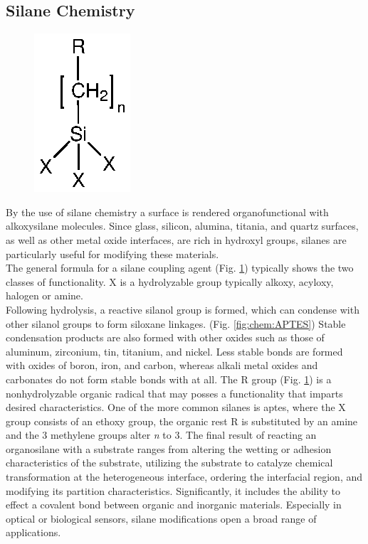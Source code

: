 \subsection{Silane Chemistry}
\begin{figure}
	\centering
	\includegraphics{Ressources/Chemistry/Trialkoxysilan}
	\label{fig:chem:trialkoxysilane}
\end{figure} 
By the use of silane chemistry a surface is rendered organofunctional with alkoxysilane molecules. Since glass, silicon, alumina, titania, and quartz surfaces, as well as other metal oxide interfaces, are rich in hydroxyl groups, silanes are particularly useful for modifying these materials. \cite{lit:chem:silanizingGlass}\\The general formula for a silane coupling agent (Fig. \ref{fig:chem:trialkoxysilane}) typically
shows the two classes of functionality. X is a hydrolyzable
group typically alkoxy, acyloxy, halogen or amine.\\
Following hydrolysis, a reactive \gls{silanol} group is formed, which can condense with other silanol groups to form \gls{siloxane} linkages. (Fig. \ref{fig:chem:APTES}) Stable condensation products are also formed with
other oxides such as those of aluminum, zirconium, tin,
titanium, and nickel. Less stable bonds are formed with
oxides of boron, iron, and carbon, whereas alkali metal oxides and
carbonates do not form stable bonds with  at all. The R group (Fig. \ref{fig:chem:trialkoxysilane}) is a nonhydrolyzable organic radical that may posses
a functionality that imparts desired characteristics. One of the more common silanes is \gls{aptes}, where the X group consists of an \acrfull{ethoxy} group, the organic rest R is substituted by an \acrfull{amine} and the 3 \acrfull{methylene} groups alter \textit{n} to 3. \cite{lit:chem:GELEST} 
The final result of reacting an organosilane with a substrate ranges from altering the wetting or adhesion characteristics of the substrate, utilizing the substrate to catalyze chemical transformation at the heterogeneous interface, ordering the interfacial region, and modifying its partition characteristics. Significantly, it includes the ability to effect a covalent bond between organic and inorganic materials. Especially in optical or biological sensors, silane modifications open a broad range of applications. 

